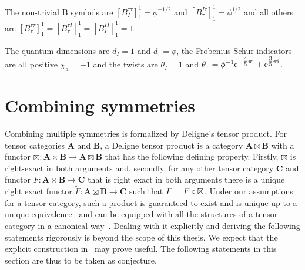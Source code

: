 The non-trivial B symbols are $[B^{\tau\tau}_I]^1_1 = \phi^{-1/2}$ and $[B^{I\tau}_\tau]^1_1 = \phi^{1/2}$ and all others are $[B^{\tau\tau}_\tau]^1_1 = [B^{\tau I}_\tau]^1_1 = [B^{II}_I]^1_1 = 1$.

The quantum dimensions are $d_I = 1$ and $d_\tau = \phi$, the Frobenius Schur indicators are all positive $\chi_a = +1$ and the twists are $\theta_I = 1$ and $\theta_\tau = \phi^{-1} \mathrm{e}^{-\tfrac{4}{5}\pi\mathrm{i} } + \mathrm{e}^{\tfrac{3}{5}\pi\mathrm{i} }$.


\section{Combining symmetries}
\label{sec:topo_data:product}

Combining multiple symmetries is formalized by Deligne's tensor product.
%
For tensor categories $\mathbf{A}$ and $\mathbf{B}$, a Deligne tensor product is a category $\mathbf{A} \boxtimes \mathbf{B}$ with a functor $\boxtimes: \mathbf{A} \times \mathbf{B} \to \mathbf{A} \boxtimes \mathbf{B}$ that has the following defining property.
%
Firstly, $\boxtimes$ is right-exact in both arguments and, secondly, for any other tensor category $\mathbf{C}$ and functor $F: \mathbf{A} \times \mathbf{B} \to \mathbf{C}$ that is right exact in both arguments there is a unique right exact functor $\tilde{F}: \mathbf{A} \boxtimes \mathbf{B} \to \mathbf{C}$ such that $F = \tilde{F} \circ \boxtimes$.
%
Under our assumptions for a tensor category, such a product is guaranteed to exist and is unique up to a unique equivalence~\cite[Prop 1.11.2]{etingof2015} and can be equipped with all the structures of a tensor category in a canonical way~\cite[Prop 4.6.1]{etingof2015}.
%
Dealing with it explicitly and deriving the following statements rigorously is beyond the scope of this thesis.
%
We expect that the explicit construction in~\cite[Def. 8.45]{heunen2019} may prove useful.
%
The following statements in this section are thus to be taken as conjecture.



